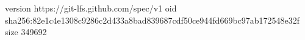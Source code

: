 version https://git-lfs.github.com/spec/v1
oid sha256:82e1c4e1308c9286c2d433a8bad839687cdf50ce944fd669bc97ab172548e32f
size 349692
